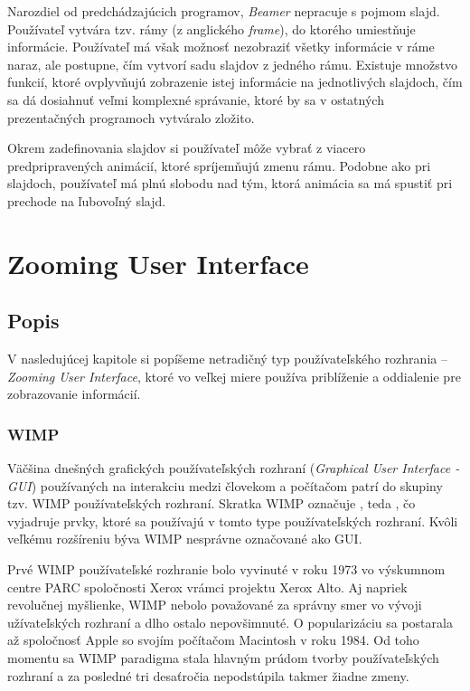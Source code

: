 Narozdiel od predchádzajúcich programov, \textit{Beamer} nepracuje s pojmom slajd. Používateľ vytvára tzv. rámy (z anglického \textit{frame}), do ktorého umiestňuje informácie.  Používateľ má však možnosť nezobraziť všetky informácie v ráme naraz, ale postupne, čím vytvorí sadu slajdov z jedného rámu. Existuje množstvo funkcií, ktoré ovplyvňujú zobrazenie istej informácie na jednotlivých slajdoch, čím sa dá dosiahnuť veľmi komplexné správanie, ktoré by sa v ostatných prezentačných programoch vytváralo zložito.

Okrem zadefinovania slajdov si používateľ môže vybrať z viacero predpripravených animácií, ktoré spríjemňujú zmenu rámu. Podobne ako pri slajdoch, používateľ má plnú slobodu nad tým, ktorá animácia sa má spustiť pri prechode na ľubovoľný slajd.

\chapter{Zooming User Interface} \label{ch:zui}

\section{Popis}

V nasledujúcej kapitole si popíšeme netradičný typ používateľského rozhrania -- \textit{Zooming User Interface}, ktoré vo veľkej miere používa priblíženie a oddialenie pre zobrazovanie informácií.

\subsection{WIMP} \label{sec:wimp}

Väčšina dnešných grafických používateľských rozhraní (\textit{Graphical User Interface - GUI}) používaných na interakciu medzi človekom a počítačom patrí do skupiny tzv. WIMP používateľských rozhraní. Skratka WIMP označuje \textit{}, teda , čo vyjadruje prvky, ktoré sa používajú v tomto type používateľských rozhraní. Kvôli veľkému rozšíreniu býva WIMP nesprávne označované ako GUI.

Prvé WIMP používateľské rozhranie bolo vyvinuté v roku 1973 vo výskumnom centre PARC spoločnosti Xerox vrámci projektu Xerox Alto. Aj napriek revolučnej myšlienke, WIMP nebolo považované za správny smer vo vývoji užívateľských rozhraní a dlho ostalo nepovšimnuté. O popularizáciu sa postarala až spoločnosť Apple so svojím počítačom Macintosh v roku 1984. Od toho momentu sa WIMP paradigma stala hlavným prúdom tvorby používateľských rozhraní a za posledné tri desaťročia nepodstúpila takmer žiadne zmeny.

